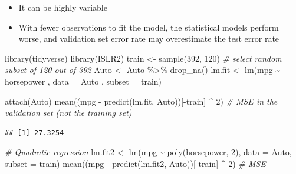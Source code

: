 \documentclass[
]{book}
\newenvironment{Shaded}{\begin{snugshade}}{\end{snugshade}}
\newcommand{\AttributeTok}[1]{\textcolor[rgb]{0.77,0.63,0.00}{#1}}
\newcommand{\CommentTok}[1]{\textcolor[rgb]{0.56,0.35,0.01}{\textit{#1}}}
\newcommand{\DecValTok}[1]{\textcolor[rgb]{0.00,0.00,0.81}{#1}}
\newcommand{\FunctionTok}[1]{\textcolor[rgb]{0.00,0.00,0.00}{#1}}
\newcommand{\NormalTok}[1]{#1}
\newcommand{\OtherTok}[1]{\textcolor[rgb]{0.56,0.35,0.01}{#1}}
\newcommand{\SpecialCharTok}[1]{\textcolor[rgb]{0.00,0.00,0.00}{#1}}
\begin{document}
\begin{itemize}
\item
  It can be highly variable
\item
  With fewer observations to fit the model, the statistical models perform worse, and validation set error rate may overestimate the test error rate
\end{itemize}

\begin{Shaded}
\begin{Highlighting}[]
\FunctionTok{library}\NormalTok{(tidyverse)}
\FunctionTok{library}\NormalTok{(ISLR2)}
\NormalTok{train }\OtherTok{\textless{}{-}} \FunctionTok{sample}\NormalTok{(}\DecValTok{392}\NormalTok{, }\DecValTok{120}\NormalTok{) }\CommentTok{\# select random subset of 120 out of 392}
\NormalTok{Auto }\OtherTok{\textless{}{-}}\NormalTok{ Auto }\SpecialCharTok{\%\textgreater{}\%} \FunctionTok{drop\_na}\NormalTok{()}
\NormalTok{lm.fit }\OtherTok{\textless{}{-}} \FunctionTok{lm}\NormalTok{(mpg }\SpecialCharTok{\textasciitilde{}}\NormalTok{ horsepower , }\AttributeTok{data =}\NormalTok{ Auto , }\AttributeTok{subset =}\NormalTok{ train)}

\FunctionTok{attach}\NormalTok{(Auto)}
\FunctionTok{mean}\NormalTok{((mpg }\SpecialCharTok{{-}} \FunctionTok{predict}\NormalTok{(lm.fit, Auto))[}\SpecialCharTok{{-}}\NormalTok{train] }\SpecialCharTok{\^{}} \DecValTok{2}\NormalTok{) }\CommentTok{\# MSE in the validation set (not the training set)}
\end{Highlighting}
\end{Shaded}

\begin{verbatim}
## [1] 27.3254
\end{verbatim}

\begin{Shaded}
\begin{Highlighting}[]
\CommentTok{\# Quadratic regression}
\NormalTok{lm.fit2 }\OtherTok{\textless{}{-}} \FunctionTok{lm}\NormalTok{(mpg }\SpecialCharTok{\textasciitilde{}} \FunctionTok{poly}\NormalTok{(horsepower, }\DecValTok{2}\NormalTok{), }\AttributeTok{data =}\NormalTok{ Auto, }\AttributeTok{subset =}\NormalTok{ train)}
\FunctionTok{mean}\NormalTok{((mpg }\SpecialCharTok{{-}} \FunctionTok{predict}\NormalTok{(lm.fit2, Auto))[}\SpecialCharTok{{-}}\NormalTok{train] }\SpecialCharTok{\^{}} \DecValTok{2}\NormalTok{) }\CommentTok{\# MSE}
\end{Highlighting}
\end{Shaded}
\end{document}
